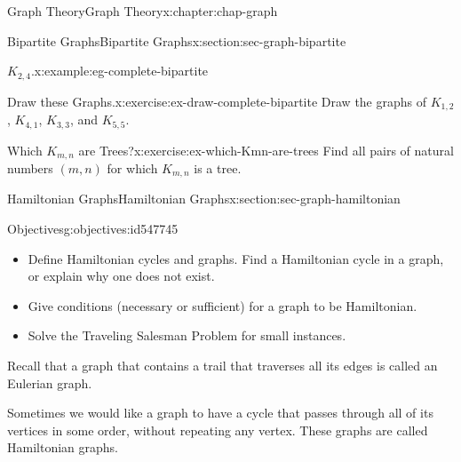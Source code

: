 \documentclass[oneside,10pt,]{book}
\numberwithin{equation}{section}
\begin{document}
\begin{chapterptx}{Graph Theory}{}{Graph Theory}{}{}{x:chapter:chap-graph}
\begin{sectionptx}{Bipartite Graphs}{}{Bipartite Graphs}{}{}{x:section:sec-graph-bipartite}
\begin{example}{\(K_{2,4}\).}{x:example:eg-complete-bipartite}
\begin{sidebyside}{1}{0.375}{0.375}{0}
\begin{sbspanel}{0.25}
{
}%
\end{sbspanel}%
\end{sidebyside}%
\end{example}
\begin{inlineexercise}{Draw these Graphs.}{x:exercise:ex-draw-complete-bipartite}%
Draw the graphs of \(K_{1,2}\), \(K_{4,1}\), \(K_{3,3}\), and \(K_{5,5}\).%
\end{inlineexercise}%
\begin{inlineexercise}{Which \(K_{m,n}\) are Trees?}{x:exercise:ex-which-Kmn-are-trees}%
Find all pairs of natural numbers \((m,n)\) for which \(K_{m,n}\) is a tree.%
\end{inlineexercise}%
\end{sectionptx}
%
%
\typeout{************************************************}
\typeout{************************************************}
%
\begin{sectionptx}{Hamiltonian Graphs}{}{Hamiltonian Graphs}{}{}{x:section:sec-graph-hamiltonian}
\begin{objectives}{Objectives}{g:objectives:id547745}
%
\begin{itemize}[label=\textbullet]
\item{}Define Hamiltonian cycles and graphs. Find a Hamiltonian cycle in a graph, or explain why one does not exist.%
\item{}Give conditions (necessary or sufficient) for a graph to be Hamiltonian.%
\item{}Solve the Traveling Salesman Problem for small instances.%
\end{itemize}
\end{objectives}
Recall that a graph that contains a trail that traverses all its edges is called an Eulerian graph.%
\par
Sometimes we would like a graph to have a cycle that passes through all of its vertices in some order, without repeating any vertex. These graphs are called Hamiltonian graphs.%

\end{sectionptx}
\end{chapterptx}
\end{document}
